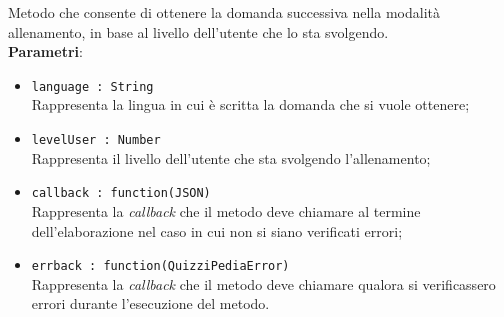 \begin{itemize}
\begin{itemize}
			Metodo che consente di ottenere la domanda successiva nella modalità allenamento, in base al livello dell'utente che lo sta svolgendo. \\
			\textbf{Parametri}:
			\begin{itemize}
			\item \texttt{language : String} \\
			Rappresenta la lingua in cui è scritta la domanda che si vuole ottenere;
			\item \texttt{levelUser : Number} \\
			Rappresenta il livello dell'utente che sta svolgendo l'allenamento;
			\item \texttt{callback : function(JSON)} \\
			Rappresenta la \textit{callback} che il metodo deve chiamare al termine dell'elaborazione nel caso in cui non si siano verificati errori;
			\item \texttt{errback : function(QuizziPediaError)} \\
			Rappresenta la \textit{callback} che il metodo deve chiamare qualora si verificassero errori durante l'esecuzione del metodo.
			\end{itemize}
		\end{itemize}
\end{itemize}
